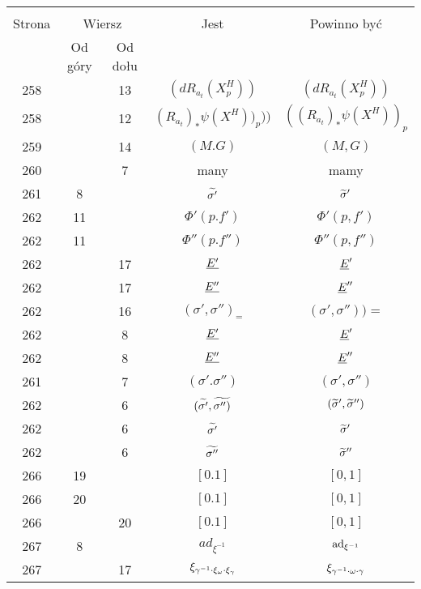 \documentclass[a4paper,11pt]{article}
\begin{document}
\begin{center}
  \begin{tabular}{|c|c|c|c|c|}
    \hline
    & \multicolumn{2}{c|}{} & & \\
    Strona & \multicolumn{2}{c|}{Wiersz} & Jest
                              & Powinno być \\ \cline{2-3}
    & Od góry & Od dołu & & \\
    \hline
    258 & & 13 & $( dR_{ a_{ t } }( X_{ p }^{ H } ) )$
           & $( dR_{ a_{ t } }( X_{ p }^{ H } ) )$ \\
    258 & & 12 & $( R_{ a_{ t } } )_{ * } \psi( X^{ H } ) )_{ p } ) )$
           & $( ( R_{ a_{ t } } )_{ * } \psi( X^{ H } ) )_{ p }$ \\
    259 & & 14 & $( M. G )$ & $( M, G )$ \\
    260 & &  7 & many & mamy \\
    261 &  8 & & $\widetilde{ \sigma' }$ & $\widetilde{ \sigma }'$ \\
    262 & 11 & & $\Phi'( p. f' )$ & $\Phi'( p, f' )$ \\
    262 & 11 & & $\Phi''( p. f'' )$ & $\Phi''( p, f'' )$ \\
    262 & & 17 & $\underline{ E' }$ & $\underline{ E }'$ \\
    262 & & 17 & $\underline{ E'' }$ & $\underline{ E }''$ \\
    262 & & 16 & $( \sigma', \sigma'' )_{ = }$
           & $( \sigma', \sigma'' ) ) =$ \\
    262 & &  8 & $\underline{ E' }$ & $\underline{ E }'$ \\
    262 & &  8 & $\underline{ E'' }$ & $\underline{ E }''$ \\
    261 & &  7 & $( \sigma'. \sigma'' )$ & $( \sigma', \sigma'' )$ \\
    262 & &  6 & $( \widetilde{ \sigma' }, \widetilde{ \sigma'' ) }$
           & $( \widetilde{ \sigma }', \widetilde{ \sigma }'' )$ \\
    262 & &  6 & $\widetilde{ \sigma' }$ & $\widetilde{ \sigma }'$ \\
    262 & &  6 & $\widetilde{ \sigma'' }$ & $\widetilde{ \sigma }''$ \\
    266 & 19 & & $[ 0. 1 ]$ & $[ 0, 1 ]$ \\
    266 & 20 & & $[ 0. 1 ]$ & $[ 0, 1 ]$ \\
    266 & & 20 & $[ 0. 1 ]$ & $[ 0, 1 ]$ \\
    267 & 8 & & $ad_{ \xi^{ -1 } }$ & $\mathrm{ad}_{ \xi^{ -1 } }$ \\
    267 & & 17 & $\xi_{ \gamma^{ - 1 } \cdot \xi_{ \omega } \cdot \xi_{ \gamma } }$
           & $\xi_{ \gamma^{ - 1 } \cdot \omega \cdot \gamma }$ \\

\end{tabular}
\end{center}
\end{document}
